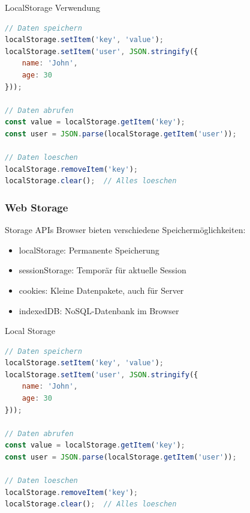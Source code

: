 \begin{KR}{LocalStorage Verwendung}
\begin{lstlisting}[language=JavaScript, style=basesmol]
// Daten speichern
localStorage.setItem('key', 'value');
localStorage.setItem('user', JSON.stringify({
    name: 'John',
    age: 30
}));

// Daten abrufen
const value = localStorage.getItem('key');
const user = JSON.parse(localStorage.getItem('user'));

// Daten loeschen
localStorage.removeItem('key');
localStorage.clear();  // Alles loeschen
\end{lstlisting}
\end{KR}



\subsubsection{Web Storage}

\begin{concept}{Storage APIs}
    Browser bieten verschiedene Speichermöglichkeiten:
    \begin{itemize}
        \item localStorage: Permanente Speicherung
        \item sessionStorage: Temporär für aktuelle Session
        \item cookies: Kleine Datenpakete, auch für Server
        \item indexedDB: NoSQL-Datenbank im Browser
    \end{itemize}
\end{concept}

\begin{KR}{Local Storage}
\begin{lstlisting}[language=JavaScript, style=basesmol]
// Daten speichern
localStorage.setItem('key', 'value');
localStorage.setItem('user', JSON.stringify({
    name: 'John',
    age: 30
}));

// Daten abrufen
const value = localStorage.getItem('key');
const user = JSON.parse(localStorage.getItem('user'));

// Daten loeschen
localStorage.removeItem('key');
localStorage.clear();  // Alles loeschen
\end{lstlisting}
\end{KR}

